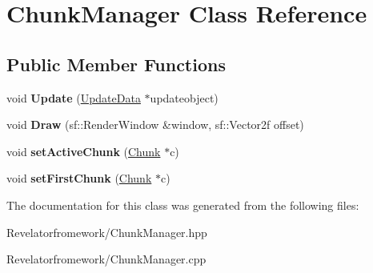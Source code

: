 \hypertarget{class_chunk_manager}{\section{Chunk\-Manager Class Reference}
\label{class_chunk_manager}
}
\subsection*{Public Member Functions}
\begin{DoxyCompactItemize}
\item 
\hypertarget{class_chunk_manager_a601244f4c4a114fe2a646e4b5ad32a6e}{void {\bfseries Update} (\hyperlink{class_update_data}{Update\-Data} $\ast$updateobject)}\label{class_chunk_manager_a601244f4c4a114fe2a646e4b5ad32a6e}

\item 
\hypertarget{class_chunk_manager_a9cb7e15589f54b6937a2b12711403450}{void {\bfseries Draw} (sf\-::\-Render\-Window \&window, sf\-::\-Vector2f offset)}\label{class_chunk_manager_a9cb7e15589f54b6937a2b12711403450}

\item 
\hypertarget{class_chunk_manager_a00cea265f033fdc3b2188b1099094f08}{void {\bfseries set\-Active\-Chunk} (\hyperlink{class_chunk}{Chunk} $\ast$c)}\label{class_chunk_manager_a00cea265f033fdc3b2188b1099094f08}

\item 
\hypertarget{class_chunk_manager_a0b4794622d5e281a55f9bc99950201dc}{void {\bfseries set\-First\-Chunk} (\hyperlink{class_chunk}{Chunk} $\ast$c)}\label{class_chunk_manager_a0b4794622d5e281a55f9bc99950201dc}

\end{DoxyCompactItemize}


The documentation for this class was generated from the following files\-:\begin{DoxyCompactItemize}
\item 
Revelatorfromework/Chunk\-Manager.\-hpp\item 
Revelatorfromework/Chunk\-Manager.\-cpp\end{DoxyCompactItemize}
